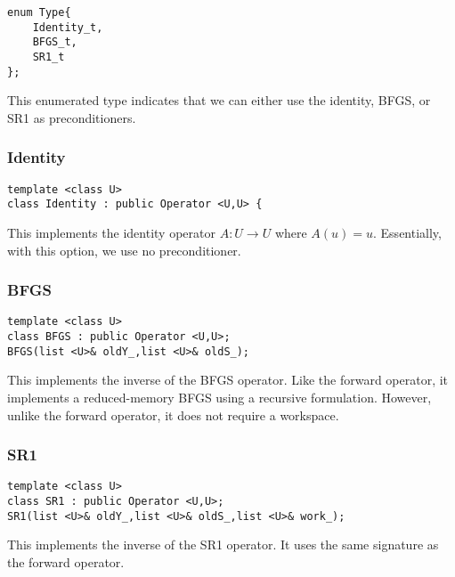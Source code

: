 \documentclass{article}
\begin{document}
\begin{flushleft}
\begin{lstlisting}
enum Type{      
    Identity_t,  
    BFGS_t,       
    SR1_t          
};
\end{lstlisting}
\end{flushleft}

This enumerated type indicates that we can either use the identity, BFGS, or SR1 as preconditioners.

\subsubsection{Identity}

\begin{flushleft}
\begin{lstlisting}
template <class U>
class Identity : public Operator <U,U> {
\end{lstlisting}
\end{flushleft}

This implements the identity operator $A:U\rightarrow U$ where $A(u)=u$.  Essentially, with this option, we use no preconditioner.


\subsubsection{BFGS}

\begin{flushleft}
\begin{lstlisting}
template <class U>
class BFGS : public Operator <U,U>;
BFGS(list <U>& oldY_,list <U>& oldS_); 
\end{lstlisting}
\end{flushleft}

This implements the inverse of the BFGS operator.  Like the forward operator, it implements a reduced-memory BFGS using a recursive formulation.  However, unlike the forward operator, it does not require a workspace.

\subsubsection{SR1}

\begin{flushleft}
\begin{lstlisting}
template <class U>
class SR1 : public Operator <U,U>;
SR1(list <U>& oldY_,list <U>& oldS_,list <U>& work_); 
\end{lstlisting}
\end{flushleft}

This implements the inverse of the SR1 operator.  It uses the same signature as the forward operator.
\end{document}

